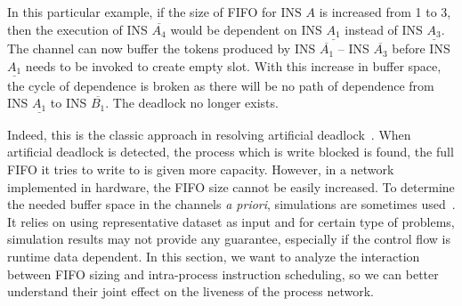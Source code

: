 In this particular example, if the size of FIFO for $\text{INS }A$ is increased
from 1 to 3, then the execution of INS $\overline{A_4}$ would be dependent on 
INS $\underline{A_1}$ instead of INS $\underline{A_3}$. The
channel can now buffer the tokens produced by INS $\overline{A_1}$ -- INS $\overline{A_3}$ before INS $\underline{A_1}$ needs to be invoked to create empty slot. With this increase in buffer space, the cycle of dependence is broken as there will be no path of dependence from INS $\underline{A_1}$
to INS $\overline{B_1}$. The deadlock no longer exists.


Indeed, this is the classic approach in resolving artificial deadlock~\cite{}. 
When artificial deadlock is detected, the process which is write blocked is found, the full FIFO it tries to write to is given more capacity. 
However, in a network implemented in hardware, the FIFO size cannot be easily increased.
To determine the needed buffer space in the channels \textit{a priori}, simulations are sometimes used~\cite{}. It relies 
on using representative dataset as input and for certain type of problems, simulation results may not provide any guarantee, especially if the control flow is runtime data dependent. In this section, we want to analyze the interaction between FIFO
sizing and intra-process instruction scheduling, 
so we can better understand
their joint effect on the liveness of the process network. 

